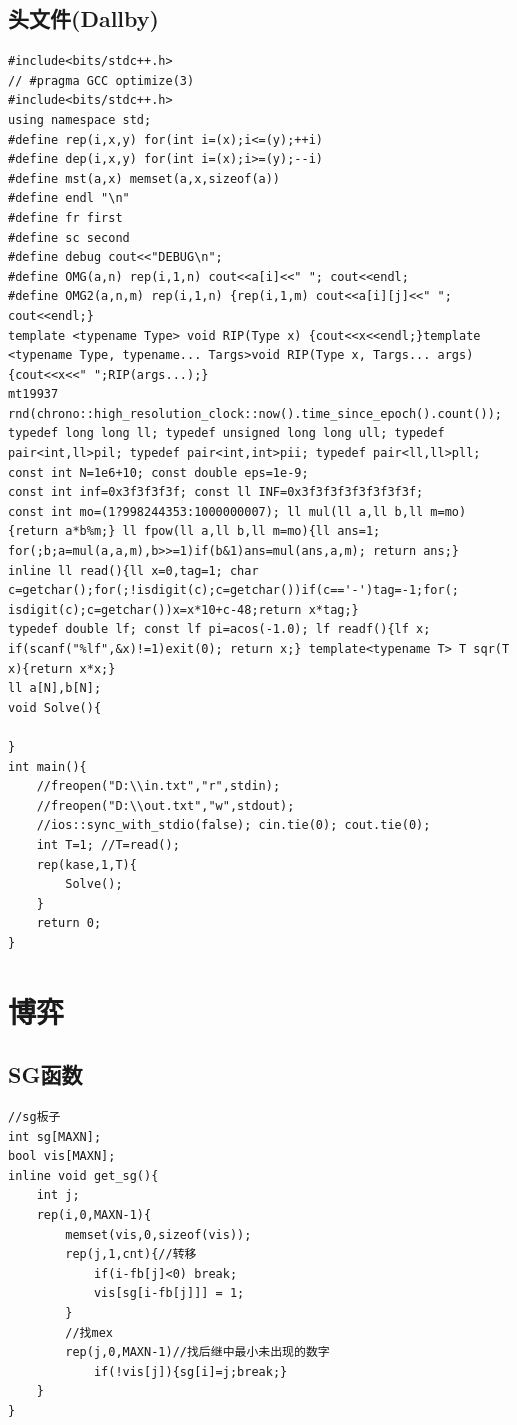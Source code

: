 \documentclass[a4]{ctexart}
\begin{document}
\subsection{头文件(Dallby)}
\begin{lstlisting}
#include<bits/stdc++.h>
// #pragma GCC optimize(3)
#include<bits/stdc++.h>
using namespace std;
#define rep(i,x,y) for(int i=(x);i<=(y);++i)
#define dep(i,x,y) for(int i=(x);i>=(y);--i)
#define mst(a,x) memset(a,x,sizeof(a))
#define endl "\n"
#define fr first
#define sc second
#define debug cout<<"DEBUG\n";
#define OMG(a,n) rep(i,1,n) cout<<a[i]<<" "; cout<<endl;
#define OMG2(a,n,m) rep(i,1,n) {rep(i,1,m) cout<<a[i][j]<<" "; cout<<endl;}
template <typename Type> void RIP(Type x) {cout<<x<<endl;}template <typename Type, typename... Targs>void RIP(Type x, Targs... args) {cout<<x<<" ";RIP(args...);}
mt19937 rnd(chrono::high_resolution_clock::now().time_since_epoch().count());
typedef long long ll; typedef unsigned long long ull; typedef pair<int,ll>pil; typedef pair<int,int>pii; typedef pair<ll,ll>pll;
const int N=1e6+10; const double eps=1e-9;
const int inf=0x3f3f3f3f; const ll INF=0x3f3f3f3f3f3f3f3f;
const int mo=(1?998244353:1000000007); ll mul(ll a,ll b,ll m=mo){return a*b%m;} ll fpow(ll a,ll b,ll m=mo){ll ans=1; for(;b;a=mul(a,a,m),b>>=1)if(b&1)ans=mul(ans,a,m); return ans;}
inline ll read(){ll x=0,tag=1; char c=getchar();for(;!isdigit(c);c=getchar())if(c=='-')tag=-1;for(; isdigit(c);c=getchar())x=x*10+c-48;return x*tag;}
typedef double lf; const lf pi=acos(-1.0); lf readf(){lf x; if(scanf("%lf",&x)!=1)exit(0); return x;} template<typename T> T sqr(T x){return x*x;}
ll a[N],b[N];
void Solve(){

}
int main(){
    //freopen("D:\\in.txt","r",stdin);
    //freopen("D:\\out.txt","w",stdout);
    //ios::sync_with_stdio(false); cin.tie(0); cout.tie(0);
    int T=1; //T=read();
    rep(kase,1,T){
        Solve();
    }
    return 0;
}
\end{lstlisting}
 

\section{博弈}
\subsection{SG函数}
\begin{lstlisting}
//sg板子
int sg[MAXN];
bool vis[MAXN];
inline void get_sg(){
    int j;
    rep(i,0,MAXN-1){
        memset(vis,0,sizeof(vis));
        rep(j,1,cnt){//转移
            if(i-fb[j]<0) break;
            vis[sg[i-fb[j]]] = 1;
        }
        //找mex
        rep(j,0,MAXN-1)//找后继中最小未出现的数字
            if(!vis[j]){sg[i]=j;break;}
    }
}
\end{lstlisting}
\end{document}
